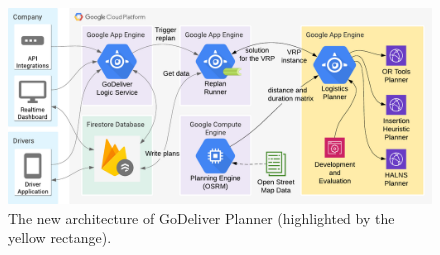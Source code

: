     \begin{figure}[!ht]
        \centering
        \includegraphics[width=1\textwidth]{figures/godeliver-architecture-new.pdf}
        \caption[The new architecture of GoDeliver Planner.]{The new architecture of GoDeliver Planner (highlighted by the yellow rectange).}
        \label{fig:godeliver-architecture-new}
    \end{figure}
    